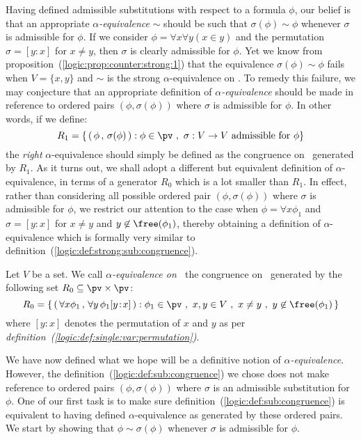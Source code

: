 Having defined admissible substitutions with respect to a formula
$\phi$, our belief is that an appropriate {\em $\alpha$-equivalence} 
$\sim$ should be such that $\sigma(\phi)\sim\phi$
whenever $\sigma$ is admissible for $\phi$. If we consider
$\phi=\forall x\forall y(x \in y)$ and the permutation
$\sigma=[y\!:\!x]$ for $x\neq y$, then $\sigma$ is clearly
admissible for $\phi$. Yet we know from
proposition~(\ref{logic:prop:counter:strong:1}) that the equivalence
$\sigma(\phi)\sim\phi$ fails when $V=\{x,y\}$ and $\sim$ is the
strong $\alpha$-equivalence on \pv. To remedy this failure, we
may conjecture that an appropriate definition of {\em $\alpha$-equivalence} 
should be made in reference to ordered pairs
$(\phi,\sigma(\phi))$ where $\sigma$ is admissible for $\phi$. In
other words, if we define:
    \[
    R_{1}=\left\{\,(\,\phi\,,\,\sigma(\phi)\,):\phi\in\pv\ ,\
    \mbox{$\sigma:V\to V$ admissible for $\phi$} \right\}
    \]
the {\em right} $\alpha$-equivalence should simply be defined as
the congruence on \pv\ generated by $R_{1}$. As it turns out, we
shall adopt a different but equivalent definition of 
$\alpha$-equivalence, in terms of a generator $R_{0}$ which is a
lot smaller than $R_{1}$. In effect, rather than considering all
possible ordered pair $(\phi,\sigma(\phi))$ where $\sigma$ is
admissible for $\phi$, we restrict our attention to the case when
$\phi=\forall x\phi_{1}$ and $\sigma=[y\!:\!x]$ for $x\neq y$ and
$y\not\in\free(\phi_{1})$, thereby obtaining a definition of 
$\alpha$-equivalence which is formally very similar to
definition~(\ref{logic:def:strong:sub:congruence}). 

\begin{defin}\label{logic:def:sub:congruence}
Let $V$ be a set. We call {\em $\alpha$-equivalence on \pv\ }the
congruence on \pv\ generated by the following set $R_{0}\subseteq
\pv\times\pv$:
    \[
    R_{0}=\left\{\,(\,\forall x\phi_{1}\,,\,\forall y\,\phi_{1}[y\!:\!x]\,):
    \phi_{1}\in\pv\ ,\ x,y\in V\ ,\ x\neq y\ ,\ y\not\in\free(\phi_{1})\,\right\}
    \]
where $[y\!:\!x]$ denotes the permutation of $x$ and $y$ as per {\em
definition~(\ref{logic:def:single:var:permutation})}.
\end{defin}

We have now defined what we hope will be a definitive notion of 
{\em $\alpha$-equivalence}. However, the
definition~(\ref{logic:def:sub:congruence}) we chose does not make
reference to ordered pairs $(\phi,\sigma(\phi))$ where $\sigma$ is
an admissible substitution for $\phi$. One of our first task is to
make sure definition~(\ref{logic:def:sub:congruence}) is equivalent
to having defined $\alpha$-equivalence as generated by these
ordered pairs. We start by showing that $\phi\sim\sigma(\phi)$
whenever $\sigma$ is admissible for $\phi$.

